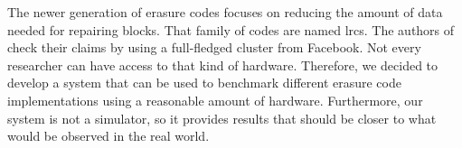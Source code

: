 The newer generation of erasure codes focuses on reducing the amount of data needed for repairing blocks.
That family of codes are named \acp{lrc}.
The authors of \autocite{XorbasVLDB} check their claims by using a full-fledged cluster from Facebook.
Not every researcher can have access to that kind of hardware.
Therefore, we decided to develop a system that can be used to benchmark different erasure code implementations using a reasonable amount of hardware.
Furthermore, our system is not a simulator, so it provides results that should be closer to what would be observed in the real world.

